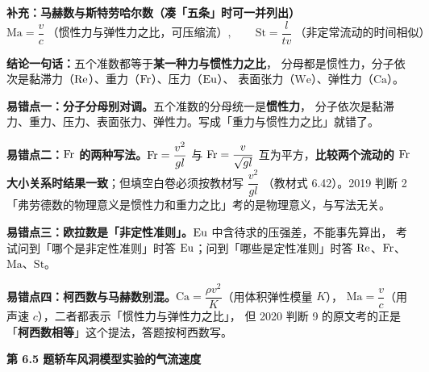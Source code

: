 \begin{jie}
\textbf{补充：马赫数与斯特劳哈尔数（凑「五条」时可一并列出）}
\[ \mathrm{Ma}=\frac{v}{c}\ \text{（惯性力与弹性力之比，可压缩流）},\qquad
   \mathrm{St}=\frac{l}{tv}\ \text{（非定常流动的时间相似）} \]

\textbf{结论一句话：}五个准数都等于\textbf{某一种力与惯性力之比}，
分母都是惯性力，分子依次是黏滞力（$\mathrm{Re}$）、重力（$\mathrm{Fr}$）、压力（$\mathrm{Eu}$）、
表面张力（$\mathrm{We}$）、弹性力（$\mathrm{Ca}$）。
\end{jie}

\begin{yicuo}
\textbf{易错点一：分子分母别对调。}五个准数的分母统一是\textbf{惯性力}，
分子依次是黏滞力、重力、压力、表面张力、弹性力。写成「重力与惯性力之比」就错了。

\textbf{易错点二：$\mathrm{Fr}$ 的两种写法。}$\mathrm{Fr}=\dfrac{v^{2}}{gl}$ 与 $\mathrm{Fr}=\dfrac{v}{\sqrt{gl}}$
互为平方，\textbf{比较两个流动的 $\mathrm{Fr}$ 大小关系时结果一致}；但填空白卷必须按教材写 $\dfrac{v^{2}}{gl}$
（教材式 6.42）。2019 判断 2「弗劳德数的物理意义是惯性力和重力之比」考的是物理意义，与写法无关。

\textbf{易错点三：欧拉数是「非定性准则」。}$\mathrm{Eu}$ 中含待求的压强差，不能事先算出，
考试问到「哪个是非定性准则」时答 $\mathrm{Eu}$；问到「哪些是定性准则」时答 $\mathrm{Re}$、$\mathrm{Fr}$、$\mathrm{Ma}$、$\mathrm{St}$。

\textbf{易错点四：柯西数与马赫数别混。}$\mathrm{Ca}=\dfrac{\rho v^{2}}{K}$（用体积弹性模量 $K$），
$\mathrm{Ma}=\dfrac{v}{c}$（用声速 $c$），二者都表示「惯性力与弹性力之比」，
但 2020 判断 9 的原文考的正是「\textbf{柯西数相等}」这个提法，答题按柯西数写。
\end{yicuo}

\noindent\textbf{第 6.5 题\quad 轿车风洞模型实验的气流速度}

